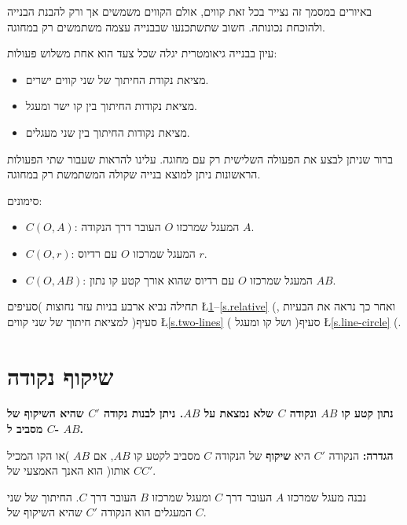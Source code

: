 באיורים במסמך זה נצייר בכל זאת קווים, אולם הקווים משמשים אך ורק להבנת הבנייה ולהוכחת נכונותה. חשוב שתשתכנעו שבבנייה עצמה משתמשים רק במחוגה.

עיון בבנייה גיאומטרית יגלה שכל צעד הוא אחת משלוש פעולות:
\begin{itemize}
\item
מציאת נקודת החיתוך של שני קווים ישרים.
\item
מציאת נקודות החיתוך בין קו ישר ומעגל.
\item
מציאת נקודות החיתוך בין שני מעגלים.
\end{itemize}
ברור שניתן לבצע את הפעולה השלישית רק עם מחוגה. עלינו להראות שעבור שתי הפעולות הראשונות ניתן למוצא בנייה שקולה המשתמשת רק במחוגה.

\np

סימונים:
\begin{itemize}
\item $C(O,A)$: 
המעגל שמרכזו
$O$
העובר דרך הנקודה
$A$.
\item $C(O,r)$:
המעגל שמרכזו
$O$
עם רדיוס
$r$.
\item $C(O,AB)$:
המעגל שמרכזו
$O$
עם רדיוס שהוא אורך קטע קו נתון
$AB$.
\end{itemize}

תחילה נביא ארבע בניות עזר נחוצות )סעיפים
\L{\ref{s.reflection}--\ref{s.relative}}%
(,
ואחר כך נראה את הבעיות למציאת חיתוך של שני קווים )סעיף
\L{\ref{s.two-lines}}%
( ושל קו ומעגל )סעיף
\L{\ref{s.line-circle}}%
(.



\section{%
שיקוף נקודה%
}\label{s.reflection}
\textbf{%
נתון קטע קו
$AB$
ונקודה 
$C$
שלא נמצאת על
$AB$.
ניתן לבנות נקודה 
$C'$
שהיא השיקוף של
$C$
מסביב ל-%
$AB$.
}

\textbf{%
הגדרה:%
}
הנקודה
$C'$
היא
\textbf{%
שיקוף%
}
של הנקודה
$C$
מסביב לקטע קו
$AB$,
אם 
$AB$
)או הקו המכיל אותו( הוא האנך האמצעי של
$CC'$.

נבנה מעגל שמרכזו
$A$
העובר דרך
$C$
ומעגל שמרכזו
$B$
העובר דרך
$C$.
החיתוך של שני המעגלים הוא הנקודה
$C'$
שהיא השיקוף של
$C$.

